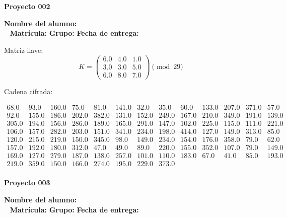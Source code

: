 \documentclass[12pt]{article}
\begin{document}
\newpage


\textbf{Proyecto 002}

\textbf{Nombre del alumno:} \underline{\hspace{13cm}}\\\
\vspace{1cm}
\textbf{Matrícula:} \underline{\hspace{4cm}} \hspace{1cm}
\textbf{Grupo:} \underline{\hspace{2cm}}
\textbf{Fecha de entrega:} \underline{\hspace{2cm}}

\medskip

Matriz llave:
\[
K = \begin{pmatrix}
6.0 & 4.0 & 1.0\\
3.0 & 3.0 & 5.0\\
6.0 & 8.0 & 7.0
\end{pmatrix} \pmod{29}
\]

Cadena cifrada:
\begin{center}
$\begin{array}{lllllllllllll}
68.0 & 93.0 & 160.0 & 75.0 & 81.0 & 141.0 & 32.0 & 35.0 & 60.0 & 133.0 & 207.0 & 371.0 & 57.0\\
92.0 & 155.0 & 186.0 & 202.0 & 382.0 & 131.0 & 152.0 & 249.0 & 167.0 & 210.0 & 349.0 & 191.0 & 139.0\\
305.0 & 194.0 & 156.0 & 286.0 & 189.0 & 165.0 & 291.0 & 147.0 & 102.0 & 225.0 & 115.0 & 111.0 & 221.0\\
106.0 & 157.0 & 282.0 & 203.0 & 151.0 & 341.0 & 234.0 & 198.0 & 414.0 & 127.0 & 149.0 & 313.0 & 85.0\\
120.0 & 215.0 & 219.0 & 150.0 & 345.0 & 98.0 & 149.0 & 234.0 & 154.0 & 176.0 & 358.0 & 79.0 & 62.0\\
157.0 & 192.0 & 180.0 & 312.0 & 47.0 & 49.0 & 89.0 & 220.0 & 155.0 & 352.0 & 107.0 & 79.0 & 149.0\\
169.0 & 127.0 & 279.0 & 187.0 & 138.0 & 257.0 & 101.0 & 110.0 & 183.0 & 67.0 & 41.0 & 85.0 & 193.0\\
219.0 & 359.0 & 150.0 & 166.0 & 274.0 & 195.0 & 229.0 & 373.0\\
\end{array}$
\end{center}

\newpage


\textbf{Proyecto 003}

\textbf{Nombre del alumno:} \underline{\hspace{13cm}}\\\
\vspace{1cm}
\textbf{Matrícula:} \underline{\hspace{4cm}} \hspace{1cm}
\textbf{Grupo:} \underline{\hspace{2cm}}
\textbf{Fecha de entrega:} \underline{\hspace{2cm}}
\end{document}
